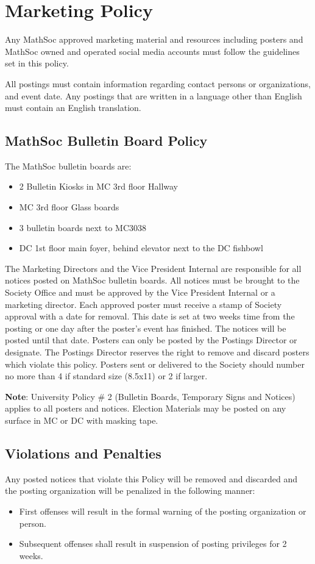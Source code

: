\section{Marketing Policy}

Any MathSoc approved marketing material and resources including posters and MathSoc owned and operated social media accounts must follow the guidelines set in this policy. 

All postings must contain information regarding contact persons or organizations, and event date.
Any postings that are written in a language other than English must contain an English translation. 

\subsection{MathSoc Bulletin Board Policy}

The MathSoc bulletin boards are: 
\begin{itemize}
    \item 2 Bulletin Kiosks in MC 3rd floor Hallway 
    \item MC 3rd floor Glass boards 
    \item 3 bulletin boards next to MC3038 
    \item DC 1st floor main foyer, behind elevator next to the DC fishbowl 
\end{itemize}

The Marketing Directors and the Vice President Internal are responsible for all notices posted on  MathSoc bulletin boards. 
All notices must be brought to the Society Office and must be approved by the  Vice President Internal or a marketing director. 
Each approved poster must receive a stamp of Society  approval with a date for removal. 
This date is set at two weeks time from the posting or one day after the  poster's event has finished. 
The notices will be posted until that date. 
Posters can only be posted by the  Postings Director or designate. 
The Postings Director reserves the right to remove and discard posters  which violate this policy. 
Posters sent or delivered to the Society should number no more than 4 if  standard size (8.5x11) or 2 if larger. 

\textbf{Note}: University Policy \# 2 (Bulletin Boards, Temporary Signs and Notices) applies to all posters and  notices. Election Materials may be posted on any surface in MC or DC with masking tape. 

\subsection{Violations and Penalties}

Any posted notices that violate this Policy will be removed and discarded and the posting organization  will be penalized in the following manner: 
\begin{itemize}
    \item First offenses will result in the formal warning of the posting organization or person.
    \item Subsequent offenses shall result in suspension of posting privileges for 2 weeks.
\end{itemize}